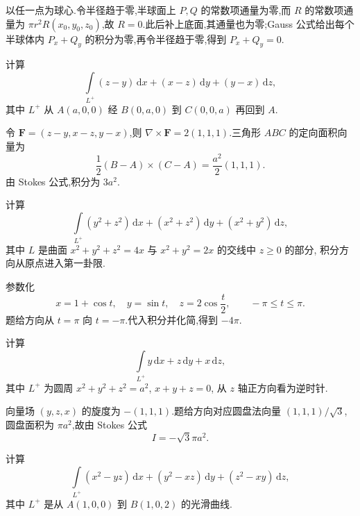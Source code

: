 \begin{solution}
    以任一点为球心.令半径趋于零,半球面上 $P,Q$ 的常数项通量为零,而 $R$ 的常数项通量为 $\pi r^2R(x_0,y_0,z_0)$,故 $R=0$.此后补上底面,其通量也为零;Gauss 公式给出每个半球体内 $P_x+Q_y$ 的积分为零,再令半径趋于零,得到 $P_x+Q_y=0$.
\end{solution}

\begin{example}
    计算
    \[
        \displaystyle\int\limits_{L^+}(z-y)\,\mathrm{d}x+(x-z)\,\mathrm{d}y+(y-x)\,\mathrm{d}z,
    \]
    其中 $L^+$ 从 $A(a,0,0)$ 经 $B(0,a,0)$ 到 $C(0,0,a)$ 再回到 $A$.
\end{example}
\exampleblank

\begin{solution}
    令 $\bm F=(z-y,x-z,y-x)$,则 $\nabla\times\bm F=2(1,1,1)$.三角形 $ABC$ 的定向面积向量为
    \[
        \dfrac{1}{2}(B-A)\times(C-A)=\dfrac{a^2}{2}(1,1,1).
    \]
    由 Stokes 公式,积分为 $3a^2$.
\end{solution}

\begin{example}
    计算
    \[
        \displaystyle\int\limits_{L^+}(y^2+z^2)\,\mathrm{d}x+(x^2+z^2)\,\mathrm{d}y+(x^2+y^2)\,\mathrm{d}z,
    \]
    其中 $L$ 是曲面 $x^2+y^2+z^2=4x$ 与 $x^2+y^2=2x$ 的交线中 $z\geq0$ 的部分, 积分方向从原点进入第一卦限.
\end{example}
\exampleblank

\begin{solution}
    参数化
    \[
        x=1+\cos t,\quad y=\sin t,\quad z=2\cos\dfrac{t}{2},\qquad -\pi\leq t\leq\pi.
    \]
    题给方向从 $t=\pi$ 向 $t=-\pi$.代入积分并化简,得到 $-4\pi$.
\end{solution}

\begin{example}
    计算
    \[
        \displaystyle\int\limits_{L^+}y\,\mathrm{d}x+z\,\mathrm{d}y+x\,\mathrm{d}z,
    \]
    其中 $L^+$ 为圆周 $x^2+y^2+z^2=a^2$, $x+y+z=0$, 从 $z$ 轴正方向看为逆时针.
\end{example}
\exampleblank

\begin{solution}
    向量场 $(y,z,x)$ 的旋度为 $-(1,1,1)$.题给方向对应圆盘法向量 $(1,1,1)/\sqrt{3}$,圆盘面积为 $\pi a^2$,故由 Stokes 公式
    \[
        I=-\sqrt{3}\pi a^2.
    \]
\end{solution}

\begin{example}
    计算
    \[
        \displaystyle\int\limits_{L^+}(x^2-yz)\,\mathrm{d}x+(y^2-xz)\,\mathrm{d}y+(z^2-xy)\,\mathrm{d}z,
    \]
    其中 $L^+$ 是从 $A(1,0,0)$ 到 $B(1,0,2)$ 的光滑曲线.
\end{example}
\exampleblank

